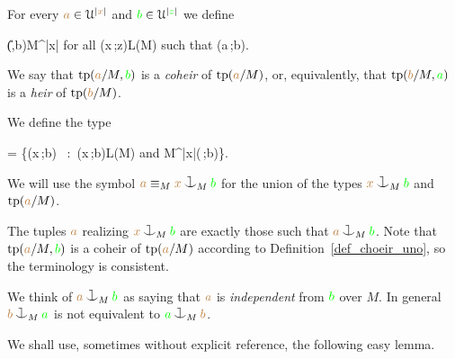 \documentclass[creche.tex]{subfiles}
\begin{document}
\begin{definition}\label{def_coheir_idepencence} 
  For every ${\color{brown} a}\in\EuScript U^{|{\color{brown} x}|}$ and ${\color{green} b}\in\EuScript U^{|{\color{green} z}|}$ we define

  \noindent\llap{\textcolor{red}{\Large\danger}\kern1.5ex}
  {\IFF}
  {\phi({\mr\U},{\gr b})\cap M^{|{\mr x}|}\neq\0
  \textrm{ for all }\phi({\mr x}\,;{\gr z})\in L(M) 
  \textrm{ such that }\phi({\mr a}\,;{\gr b})}.

  We say that ${\rm tp}({\color{brown} a}/M,{\color{green} b})$ is a \emph{coheir} of ${\rm tp}({\color{brown} a}/M)$, or, equivalently, that ${\rm tp}({\color{brown} b}/M,{\color{green} a})$ is a \emph{heir} of ${\rm tp}({\color{brown} b}/M)$.
  
  We define the type

  {=}
  {\Big\{\phi({\mr x}\,;{\gr b})
  \ :\ 
  \phi({\mr x}\,;{\gr b})\in L(M)
  \textrm{ and } M^{|{\mr x}|}\subseteq\phi(\mrU\,;{\gr b})\Big\}.}

  We will use the symbol \emph{${\mr a}\equiv_M{\mr x}\cnonfork_M{\gr b}$} 
  for the union of the types ${\mr x}\cnonfork_M{\gr b}$ and 
  ${\rm tp}({\color{brown} a}/M)$.\QED
\end{definition}
 The tuples ${\color{brown} a}$ realizing ${\mr x}\cnonfork_M{\gr b}$ are exactly those such that ${\mr a}\cnonfork_M{\gr b}$. Note that ${\rm tp}({\color{brown} a}/M,{\color{green} b})$ is a coheir of ${\rm tp}({\color{brown} a}/M)$ according to Definition~\ref{def_choeir_uno}, so the terminology is consistent.

We think of  ${\mr a}\cnonfork_M{\gr b}$ as saying that 
${\color{brown} a}$ is \emph{independent\/} from ${\color{green} b}$ over $M$.
%
%
In general %
${\mr b}\cnonfork_M{\gr a}$ is not 
equivalent to ${\gr a}\cnonfork_M{\mr b}$. 

We shall use, sometimes without explicit reference, the following easy lemma.
\end{document}
